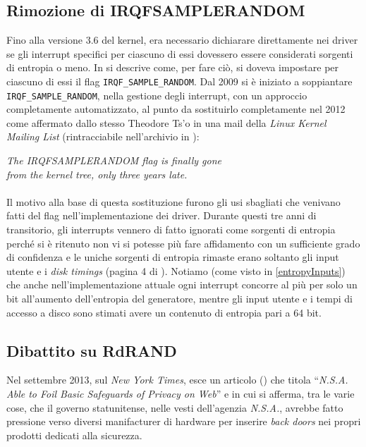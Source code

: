 \documentclass{article}
\begin{document}
 \subsection{Rimozione di IRQF\textunderscore{}SAMPLE\textunderscore{}RANDOM}
 \label{IRQFSAMPLERANDOM}
 Fino alla versione 3.6 del kernel, era necessario dichiarare direttamente nei
 driver se gli interrupt specifici per ciascuno di essi dovessero essere
 considerati sorgenti di entropia o meno. In \cite{lach} si descrive come, per
 fare ciò, si doveva impostare per ciascuno di essi il flag
 \verb+IRQF_SAMPLE_RANDOM+. Dal 2009 si è iniziato a soppiantare
 \verb+IRQF_SAMPLE_RANDOM+, nella gestione degli interrupt, con un approccio
 completamente automatizzato, al punto da sostituirlo completamente nel 2012
 come affermato dallo stesso Theodore Ts'o in una mail della \emph{Linux Kernel
 Mailing List} (rintracciabile nell'archivio in \cite{tso}):
 \begin{center}
 \emph{The 
 IRQF\textunderscore{}SAMPLE\textunderscore{}RANDOM flag is finally gone\\ from
 the kernel tree, only three years late. \Smiley{} }
 \end{center}
 
 \paragraph{}Il motivo alla base di questa sostituzione furono gli usi
 sbagliati che venivano fatti del flag nell'implementazione dei driver. Durante
 questi tre anni di transitorio, gli interrupts vennero di fatto ignorati come
 sorgenti di entropia perché si è ritenuto non vi si potesse più fare
 affidamento con un sufficiente grado di confidenza e le uniche sorgenti di
 entropia rimaste erano soltanto gli input utente e i \emph{disk timings}
 (pagina 4 di \cite{lach}). Notiamo (come visto in \ref{entropyInputs}) che
 anche nell'implementazione attuale ogni interrupt concorre al più per solo un
 bit all'aumento dell'entropia del generatore, mentre gli input utente e i
 tempi di accesso a disco sono stimati avere un contenuto di entropia pari a 64
 bit.
 
 \subsection{Dibattito su RdRAND}\label{rdrand}
 Nel settembre 2013, sul \emph{New York Times}, esce un articolo (\cite{perl})
 che titola ``\emph{N.S.A. Able to Foil Basic Safeguards of Privacy on Web}'' e
 in cui si afferma, tra le varie cose, che il governo statunitense, nelle vesti
 dell'agenzia \emph{N.S.A.}, avrebbe fatto pressione verso diversi manifacturer
 di hardware per inserire \emph{back doors} nei propri prodotti dedicati alla
 sicurezza.
\end{document}
